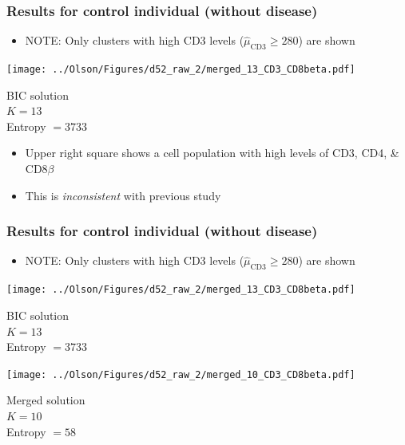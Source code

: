 \documentclass[mathserif,compress]{beamer}
\newcommand*\estim[1]{\widehat{#1}}
\renewcommand\;{\,}
\begin{document}
\begin{frame}\frametitle{Results for control individual (without disease)}
\begin{itemize}
\medskip
\item[]
\alert{NOTE}: Only clusters with high CD3 levels ($\estim\mu_\text{CD3} \ge 280$) are shown
\end{itemize}
\begin{center}
\begin{minipage}{0.4\linewidth}
\texttt{[image: ../Olson/Figures/d52\_raw\_2/merged\_13\_CD3\_CD8beta.pdf]}
\begin{center}
BIC solution
\\
$K = 13$
\\
Entropy $ = 3733$
\end{center}
\end{minipage}
\hfill
\begin{minipage}{0.5\linewidth}
\begin{itemize}
\item[]
Upper right square shows a cell population with high levels of CD3, CD4, \& CD8$\beta$
\bigskip
\item[]
This is \emph{inconsistent} with previous study
\end{itemize}
\end{minipage}
\end{center}
\end{frame}

\begin{frame}\frametitle{Results for control individual (without disease)}
\begin{itemize}
\medskip
\item[]
\alert{NOTE}: Only clusters with high CD3 levels ($\estim\mu_\text{CD3} \ge 280$) are shown
\end{itemize}
\begin{center}
\begin{minipage}{0.4\linewidth}
\texttt{[image: ../Olson/Figures/d52\_raw\_2/merged\_13\_CD3\_CD8beta.pdf]}
\begin{center}
BIC solution
\\
$K = 13$
\\
Entropy $ = 3733$
\end{center}
\end{minipage}
\hfill
\begin{minipage}{0.4\linewidth}
\texttt{[image: ../Olson/Figures/d52\_raw\_2/merged\_10\_CD3\_CD8beta.pdf]}
\begin{center}
Merged solution
\\
$K = 10$
\\
Entropy $= 58$
\end{center}
\end{minipage}
\end{center}
\end{frame}
\end{document}
